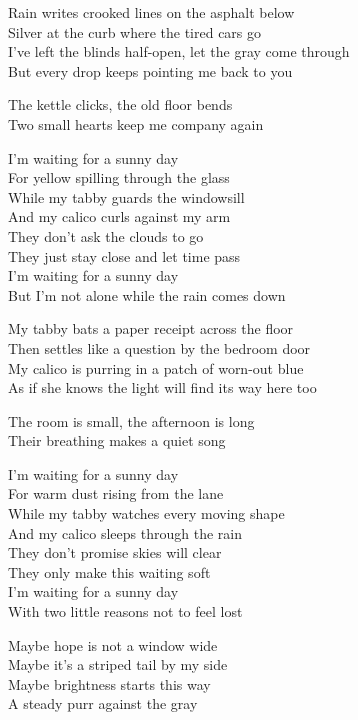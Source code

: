 \begin{lyrics}
Rain writes crooked lines on the asphalt below\\
Silver at the curb where the tired cars go\\
I've left the blinds half-open, let the gray come through\\
But every drop keeps pointing me back to you

The kettle clicks, the old floor bends\\
Two small hearts keep me company again

I'm waiting for a sunny day\\
For yellow spilling through the glass\\
While my tabby guards the windowsill\\
And my calico curls against my arm\\
They don't ask the clouds to go\\
They just stay close and let time pass\\
I'm waiting for a sunny day\\
But I'm not alone while the rain comes down

My tabby bats a paper receipt across the floor\\
Then settles like a question by the bedroom door\\
My calico is purring in a patch of worn-out blue\\
As if she knows the light will find its way here too

The room is small, the afternoon is long\\
Their breathing makes a quiet song

I'm waiting for a sunny day\\
For warm dust rising from the lane\\
While my tabby watches every moving shape\\
And my calico sleeps through the rain\\
They don't promise skies will clear\\
They only make this waiting soft\\
I'm waiting for a sunny day\\
With two little reasons not to feel lost

Maybe hope is not a window wide\\
Maybe it's a striped tail by my side\\
Maybe brightness starts this way\\
A steady purr against the gray


\end{lyrics}
